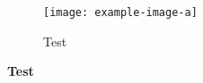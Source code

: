 \documentclass{article}
\begin{document}
\begin{figure}
	\centering
	\texttt{[image: example-image-a]}
	\label{fig:a}
	\caption{Test}
\end{figure}%

\textbf{Test}\cite{JensenUltrasoundBook}\cite{Jansson_Estimation_Perfusion}
\cite{Jensen_Algorithms}
\printbibliography
\end{document}
